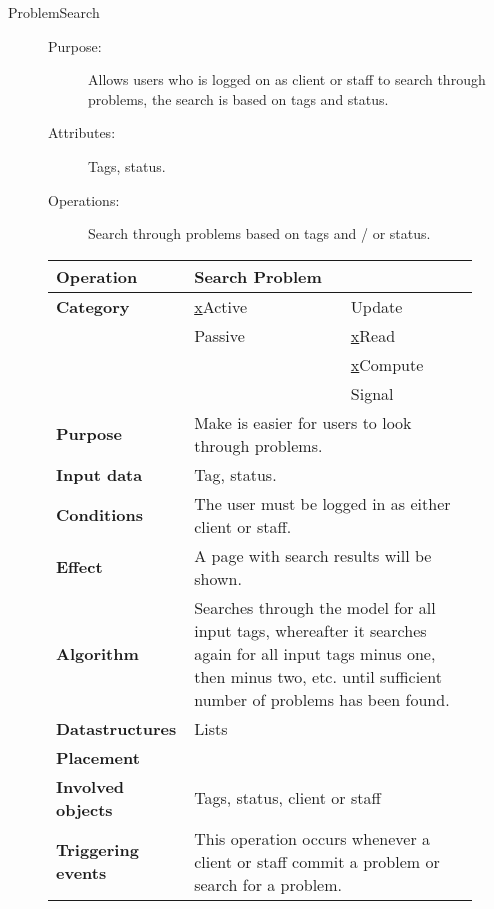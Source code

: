 \begin{description}
\item[ProblemSearch]\hfill
\begin{description}
\item[Purpose:]Allows users who is logged on as client or staff to search through problems, the search is based on tags and status.
\item[Attributes:]Tags, status.
\item[Operations:]Search through problems based on tags and / or status.
\end{description}
\end{description}

\begin{figure}
\begin{tabular}{p{3.5cm} p{4cm} p{4cm}}
\hline
\textbf{Operation}&Search Problem\\
\hline
\textbf{Category}&\underline{x}Active&\underline{ }Update\\
&\underline{ }Passive&\underline{x}Read\\
&&\underline{x}Compute\\
&&\underline{ }Signal\\
\textbf{Purpose}&\multicolumn{2}{p{8cm}}{Make is easier for users to look through problems.}\\
\textbf{Input data}&\multicolumn{2}{p{8cm}}{Tag, status.}\\
\textbf{Conditions}&\multicolumn{2}{p{8cm}}{The user must be logged in as either client or staff.}\\
\textbf{Effect}&\multicolumn{2}{p{8cm}}{A page with search results will be shown.}\\
\textbf{Algorithm}&\multicolumn{2}{p{8cm}}{Searches through the model for all input tags, whereafter it searches again for all input tags minus one, then minus two, etc. until sufficient number of problems has been found.}\\
\textbf{Datastructures}&\multicolumn{2}{p{8cm}}{Lists}\\
\textbf{Placement}&\multicolumn{2}{p{8cm}}{}\\
\textbf{Involved objects}&\multicolumn{2}{p{8cm}}{Tags, status, client or staff}\\
\textbf{Triggering events}&\multicolumn{2}{p{8cm}}{This operation occurs whenever a client or staff commit a problem or search for a problem.}\\
\hline
\end{tabular}
\end{figure}

